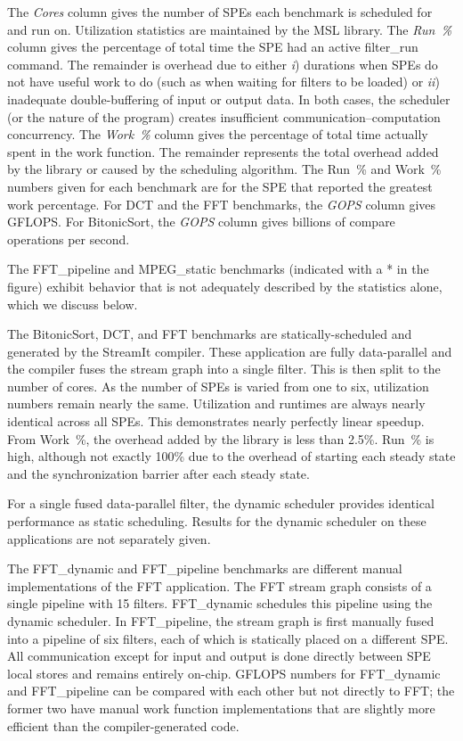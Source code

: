 The \emph{Cores} column gives the number of SPEs each benchmark is
scheduled for and run on. Utilization statistics are maintained by the
MSL library. The \emph{Run~\%} column gives the percentage of total time the SPE had an active \textsf{filter\_run} command. The remainder is overhead due to either \emph{i}) durations when SPEs do not have useful work to do (such as when waiting for filters to be loaded) or \emph{ii}) inadequate double-buffering of input or output data. In both cases, the scheduler (or the nature of the program) creates insufficient communication--computation concurrency. The \emph{Work~\%} column gives the percentage of total time actually spent in the work function. The remainder represents the total overhead added by the library or caused by the scheduling algorithm.
The Run~\% and Work~\% numbers given for each benchmark are for the SPE
that reported the greatest work percentage.
For \textsf{DCT} and the FFT benchmarks, the \emph{GOPS} column gives GFLOPS.
For \textsf{BitonicSort}, the \emph{GOPS} column gives billions of
compare operations per second.

The \textsf{FFT\_pipeline} and \textsf{MPEG\_static} benchmarks (indicated
with a \textsf{*} in the figure) exhibit behavior that is not adequately
described by the statistics alone, which we discuss below.

The \textsf{BitonicSort}, \textsf{DCT}, and \textsf{FFT} benchmarks are statically-scheduled and generated by the StreamIt compiler. These application are fully data-parallel and the compiler fuses the stream graph into a single filter. This is then split to the number of cores. 
As the number of SPEs is varied from one to six, utilization numbers remain nearly the same. Utilization and runtimes are always nearly identical across all SPEs. This demonstrates nearly perfectly linear speedup.
From Work~\%, the overhead added by the library is less than 2.5\%. Run~\% is high, although not exactly 100\% due to the overhead of starting each steady state and the synchronization barrier after each steady state.

For a single fused data-parallel filter, the dynamic scheduler provides identical performance as static scheduling. Results for the dynamic scheduler on these applications are not separately given.

The \textsf{FFT\_dynamic} and \textsf{FFT\_pipeline} benchmarks are different manual implementations of the FFT application. The FFT stream graph consists of a single pipeline with 15 filters. \textsf{FFT\_dynamic} schedules this pipeline using the dynamic scheduler. In \textsf{FFT\_pipeline}, the stream graph is first manually fused into a pipeline of six filters, each of which is statically placed on a different SPE. All communication except for input and output is done directly between SPE local stores and remains entirely on-chip. GFLOPS numbers for \textsf{FFT\_dynamic} and \textsf{FFT\_pipeline} can be compared with each other but not directly to \textsf{FFT}; the former two have manual work function implementations that are slightly more efficient than the compiler-generated code.

